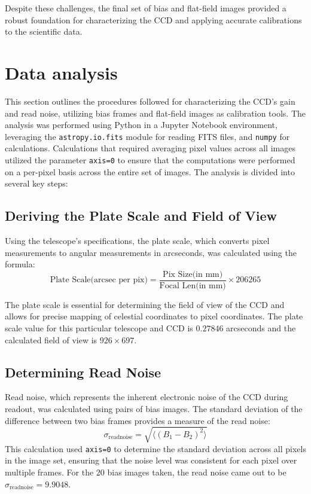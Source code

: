 \documentclass[linenumbers,twocolumn]{aastex631}
\begin{document}
Despite these challenges, the final set of bias and flat-field images provided a robust foundation for characterizing the CCD and applying accurate calibrations to the scientific data.


\section{Data analysis} 
\label{sec:results}

This section outlines the procedures followed for characterizing the CCD's gain and read noise, utilizing bias frames and flat-field images as calibration tools. The analysis was performed using Python in a Jupyter Notebook environment, leveraging the \texttt{astropy.io.fits} module for reading FITS files, and \texttt{numpy} for calculations. Calculations that required averaging pixel values across all images utilized the parameter \texttt{axis=0} to ensure that the computations were performed on a per-pixel basis across the entire set of images. The analysis is divided into several key steps:

\subsection{Deriving the Plate Scale and Field of View}
Using the telescope's specifications, the plate scale, which converts pixel measurements to angular measurements in arcseconds, was calculated using the formula:
{\small
\begin{equation}
\text{Plate Scale(arcsec per pix)} = \frac{\text{Pix Size(in mm)}}{\text{Focal Len(in mm)}} \times 206265
\end{equation}
}

The plate scale is essential for determining the field of view of the CCD and allows for precise mapping of celestial coordinates to pixel coordinates. The plate scale value for this particular telescope and CCD is $0.27846$ arcseconds and the calculated field of view is $926 \times 697$.

\subsection{Determining Read Noise}
Read noise, which represents the inherent electronic noise of the CCD during readout, was calculated using pairs of bias images. The standard deviation of the difference between two bias frames provides a measure of the read noise:
\begin{equation}
\sigma_{\text{readnoise}} = \sqrt{\langle (B_1 - B_2)^2 \rangle}
\end{equation}
This calculation used \texttt{axis=0} to determine the standard deviation across all pixels in the image set, ensuring that the noise level was consistent for each pixel over multiple frames. For the 20 bias images taken, the read noise came out to be $\sigma_{\text{readnoise}} = 9.9048$.
\end{document}
